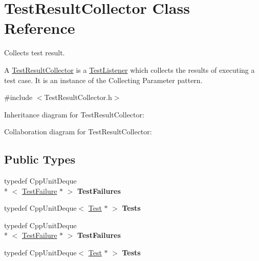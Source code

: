 \hypertarget{class_test_result_collector}{\section{Test\+Result\+Collector Class Reference}
\label{class_test_result_collector}
}


Collects test result.

A \hyperlink{class_test_result_collector}{Test\+Result\+Collector} is a \hyperlink{class_test_listener}{Test\+Listener} which collects the results of executing a test case. It is an instance of the Collecting Parameter pattern.  




{\ttfamily \#include $<$Test\+Result\+Collector.\+h$>$}



Inheritance diagram for Test\+Result\+Collector\+:


Collaboration diagram for Test\+Result\+Collector\+:
\subsection*{Public Types}
\begin{DoxyCompactItemize}
\item 
\hypertarget{class_test_result_collector_a8ae051e883095aee10d9f777664fe8af}{typedef Cpp\+Unit\+Deque\\*
$<$ \hyperlink{class_test_failure}{Test\+Failure} $\ast$ $>$ {\bfseries Test\+Failures}}\label{class_test_result_collector_a8ae051e883095aee10d9f777664fe8af}

\item 
\hypertarget{class_test_result_collector_a6ab73f8a52311857afa98a1ef049e30a}{typedef Cpp\+Unit\+Deque$<$ \hyperlink{class_test}{Test} $\ast$ $>$ {\bfseries Tests}}\label{class_test_result_collector_a6ab73f8a52311857afa98a1ef049e30a}

\item 
\hypertarget{class_test_result_collector_a8ae051e883095aee10d9f777664fe8af}{typedef Cpp\+Unit\+Deque\\*
$<$ \hyperlink{class_test_failure}{Test\+Failure} $\ast$ $>$ {\bfseries Test\+Failures}}\label{class_test_result_collector_a8ae051e883095aee10d9f777664fe8af}

\item 
\hypertarget{class_test_result_collector_a6ab73f8a52311857afa98a1ef049e30a}{typedef Cpp\+Unit\+Deque$<$ \hyperlink{class_test}{Test} $\ast$ $>$ {\bfseries Tests}}\label{class_test_result_collector_a6ab73f8a52311857afa98a1ef049e30a}

\end{DoxyCompactItemize}
